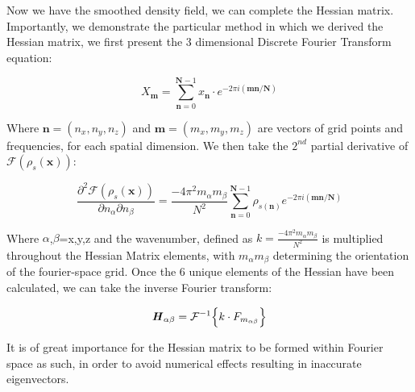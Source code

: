 \documentclass[a4paper,fleqn,usenatbib]{mnras}
\begin{document}
\\
\\
Now we have the smoothed density field, we can complete the Hessian matrix. Importantly, we demonstrate the particular method in which we derived the Hessian matrix, we  first present the 3 dimensional Discrete Fourier Transform equation:
\begin{ceqn}
\begin{equation}
X_{\textbf{m}}=\sum_{\textbf{n}=0}^{\textbf{N}-1}x_{\textbf{n}}\cdot e^{-2\pi i(\textbf{mn}/\textbf{N})}
\label{dft}
\end{equation}
\end{ceqn}
Where $\textbf{n}=(n_{x},n_{y},n_{z})$ and $\textbf{m}=(m_{x},m_{y},m_{z})$ are vectors of grid points and frequencies, for each spatial dimension. We then take the $2^{nd}$ partial derivative of  $\mathcal{F}(\rho_{s}(\textbf{x}))$:

\begin{ceqn}
\begin{equation}
\frac{\partial^{2} \mathcal{F}(\rho_{s}(\textbf{x}))}{\partial n_{\alpha} \partial n_{\beta}}=\frac{-4\pi^{2}m_{\alpha}m_{\beta}}{N^{2}}\sum_{\textbf{n}=0}^{\textbf{N}-1}\rho_{s(\textbf{n})}e^{-2\pi i(\textbf{mn}/\textbf{N})} 
\label{dftdiff}
\end{equation}
\end{ceqn}

Where $\alpha$,$\beta$=x,y,z and the wavenumber, defined as $k=\frac{-4\pi^{2}m_{\alpha}m_{\beta}}{N^{2}}$ is multiplied throughout the Hessian Matrix elements, with $m_{\alpha}m_{\beta}$ determining the orientation of the fourier-space grid. Once the 6 unique elements of the Hessian have been calculated, we can take the inverse Fourier transform:
\begin{ceqn}
\begin{equation}
\textbf{\textit{H}}_{\alpha \beta}=\mathcal{F}^{-1}\Big\{k\cdot F_{m_{\alpha \beta}}\Big\}
\label{invfouriordtf}
\end{equation}
\end{ceqn}
It is of great importance for the Hessian matrix to be formed within Fourier space as such, in order to avoid numerical effects resulting in inaccurate eigenvectors.
\end{document}

